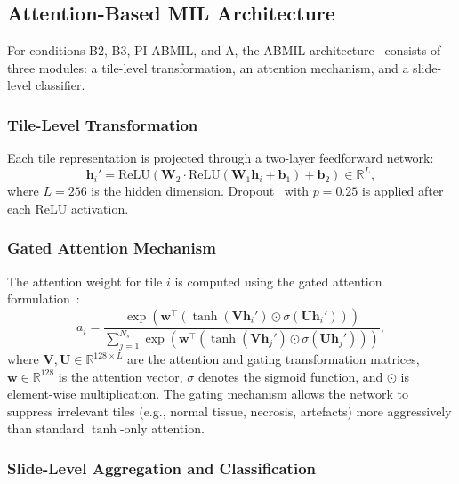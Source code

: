 \subsection{Attention-Based MIL Architecture}
\label{sec:meth:mutation:abmil}

For conditions B2, B3, PI-ABMIL, and A, the ABMIL architecture~\cite{ilse2018attention} consists of three modules: a tile-level transformation, an attention mechanism, and a slide-level classifier.

\subsubsection{Tile-Level Transformation}

Each tile representation is projected through a two-layer feedforward network:
\begin{equation}
\label{eq:tile_transform}
\mathbf{h}_i' = \text{ReLU}(\mathbf{W}_2 \cdot \text{ReLU}(\mathbf{W}_1 \mathbf{h}_i + \mathbf{b}_1) + \mathbf{b}_2) \in \mathbb{R}^{L},
\end{equation}
where $L = 256$ is the hidden dimension.
Dropout~\cite{srivastava2014dropout} with $p = 0.25$ is applied after each ReLU activation.

\subsubsection{Gated Attention Mechanism}

The attention weight for tile $i$ is computed using the gated attention formulation~\cite{ilse2018attention,lu2021data}:
\begin{equation}
\label{eq:gated_attn}
a_i = \frac{\exp\left(\mathbf{w}^\top \left(\tanh(\mathbf{V} \mathbf{h}_i') \odot \sigma(\mathbf{U} \mathbf{h}_i')\right)\right)}{\sum_{j=1}^{N_s} \exp\left(\mathbf{w}^\top \left(\tanh(\mathbf{V} \mathbf{h}_j') \odot \sigma(\mathbf{U} \mathbf{h}_j')\right)\right)},
\end{equation}
where $\mathbf{V}, \mathbf{U} \in \mathbb{R}^{128 \times L}$ are the attention and gating transformation matrices, $\mathbf{w} \in \mathbb{R}^{128}$ is the attention vector, $\sigma$ denotes the sigmoid function, and $\odot$ is element-wise multiplication.
The gating mechanism allows the network to suppress irrelevant tiles (e.g., normal tissue, necrosis, artefacts) more aggressively than standard $\tanh$-only attention.

\subsubsection{Slide-Level Aggregation and Classification}

